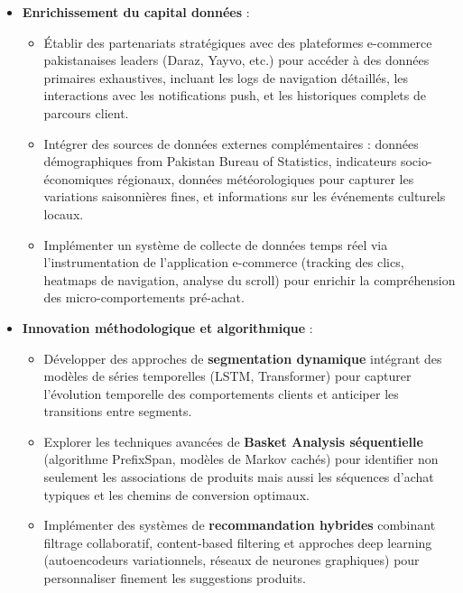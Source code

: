 \documentclass[a4paper,12pt]{article}
\begin{document}
\begin{itemize}

    \item \textbf{Enrichissement du capital données} :
    \begin{itemize}
        \item Établir des partenariats stratégiques avec des plateformes e-commerce pakistanaises leaders (Daraz, Yayvo, etc.) pour accéder à des données primaires exhaustives, incluant les logs de navigation détaillés, les interactions avec les notifications push, et les historiques complets de parcours client.
        
        \item Intégrer des sources de données externes complémentaires : données démographiques from Pakistan Bureau of Statistics, indicateurs socio-économiques régionaux, données météorologiques pour capturer les variations saisonnières fines, et informations sur les événements culturels locaux.
        
        \item Implémenter un système de collecte de données temps réel via l'instrumentation de l'application e-commerce (tracking des clics, heatmaps de navigation, analyse du scroll) pour enrichir la compréhension des micro-comportements pré-achat.
    \end{itemize}
    
    \item \textbf{Innovation méthodologique et algorithmique} :
    \begin{itemize}
        \item Développer des approches de \textbf{segmentation dynamique} intégrant des modèles de séries temporelles (LSTM, Transformer) pour capturer l'évolution temporelle des comportements clients et anticiper les transitions entre segments.
        
        \item Explorer les techniques avancées de \textbf{Basket Analysis séquentielle} (algorithme PrefixSpan, modèles de Markov cachés) pour identifier non seulement les associations de produits mais aussi les séquences d'achat typiques et les chemins de conversion optimaux.
        
        \item Implémenter des systèmes de \textbf{recommandation hybrides} combinant filtrage collaboratif, content-based filtering et approches deep learning (autoencodeurs variationnels, réseaux de neurones graphiques) pour personnaliser finement les suggestions produits.
        

\end{itemize}
\end{itemize}
\end{document}
